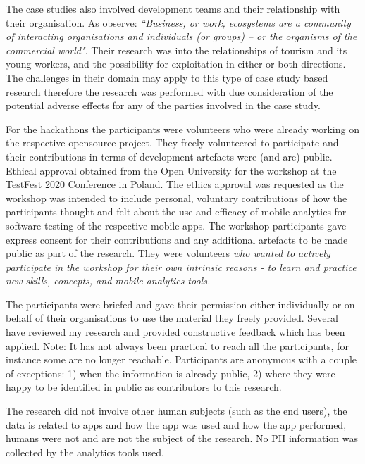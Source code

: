 The case studies also involved development teams and their relationship with their organisation. 
As \citet[p.2]{robinson2019_applying_endosymbiosis_theory_tourism_and_its_young_workers} observe: \emph{``Business, or work, ecosystems are a community of interacting organisations and individuals (or groups) – or the organisms of the commercial world"}. Their research was into the relationships of tourism and its young workers, and the possibility for exploitation in either or both directions. The challenges in their domain may apply to this type of case study based research therefore the research was performed with due consideration of the potential adverse effects for any of the parties involved in the case study.


For the hackathons the participants were volunteers who were already working on the respective opensource project. They freely volunteered to participate and their contributions in terms of development artefacts were (and are) public. Ethical approval obtained from the Open University for the workshop at the TestFest 2020 Conference in Poland. The ethics approval was requested as the workshop was intended to include personal, voluntary contributions of how the participants thought and felt about the use and efficacy of mobile analytics for software testing of the respective mobile apps. The workshop participants gave express consent for their contributions and any additional artefacts to be made public as part of the research. They were volunteers \textit{who wanted to actively participate in the workshop for their own intrinsic reasons - to learn and practice new skills, concepts, and mobile analytics tools.}

The participants were briefed and gave their permission either individually or on behalf of their organisations to use the material they freely provided. Several have reviewed my research and provided constructive feedback which has been applied. 
Note: It has not always been practical to reach all the participants, for instance some are no longer reachable.
%
Participants are anonymous with a couple of exceptions: 1) when the information is already public, 2) where they were happy to be identified in public as contributors to this research.  

The research did not involve other human subjects (such as the end users), the data is related to apps and how the app was used and how the app performed, humans were not and are not the subject of the research. No PII information was collected by the analytics tools used.


